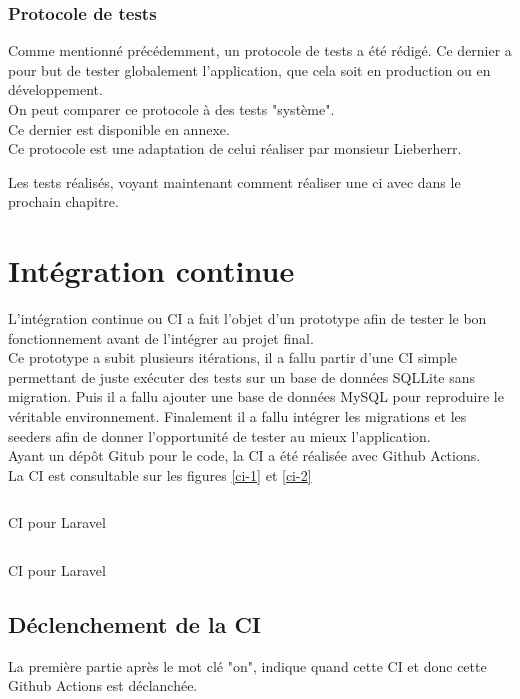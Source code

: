 \documentclass[
    iai, %
    il, %
]{heig-tb}
\begin{document}
\subsection{Protocole de tests}
Comme mentionné précédemment, un protocole de tests a été rédigé. Ce dernier a pour but de tester globalement l'application, que cela soit en production ou en développement. \\
On peut comparer ce protocole à des tests "système". \\
Ce dernier est disponible en annexe. \\
Ce protocole est une adaptation de celui réaliser par monsieur Lieberherr.

Les tests réalisés, voyant maintenant comment réaliser une \Gls{ci} avec dans le prochain chapitre.

\chapter{Intégration continue}
L'intégration continue ou CI a fait l'objet d'un prototype afin de tester le bon fonctionnement
avant de l'intégrer au projet final.\\
Ce prototype a subit plusieurs itérations, il a fallu partir d'une CI simple permettant de juste
exécuter des tests sur un base de données SQLLite sans migration. Puis il a fallu ajouter une base
de données MySQL pour reproduire le véritable environnement. Finalement il a fallu intégrer les
migrations et les seeders afin de donner l'opportunité de tester au mieux l'application.\\
Ayant un dépôt Gitub pour le code, la CI a été réalisée avec Github Actions.\\
La CI est consultable sur les figures \ref{ci-1} et \ref{ci-2}

\begin{listing}[h]
    \inputminted{yaml}{assets/code/ci-1.yml}
    \caption{CI pour Laravel \label{ci-1}}
\end{listing}

\begin{listing}[h]
    \inputminted{yaml}{assets/code/ci-2.yml}
    \caption{CI pour Laravel \label{ci-2}}
\end{listing}

\section{Déclenchement de la CI}
La première partie après le mot clé "on", indique quand cette CI et donc cette Github Actions est
déclanchée.\\
\end{document}
